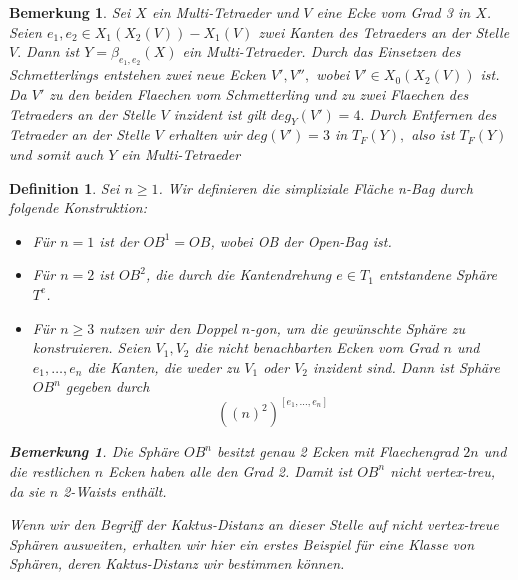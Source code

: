 \documentclass[12pt,titlepage,twoside,cleardoublepage]{article}
\theoremstyle{nummermitklammern}
\newtheorem{definition}[temp]{Definition}
\newtheorem{bemerkung}[temp]{Bemerkung}
\newtheorem{definition}[zahl]{Definition}
\newtheorem{bemerkung}[zahl]{Bemerkung}
\numberwithin{equation}{section}
\begin{document}
\begin{bemerkung}
Sei $X$ ein Multi-Tetraeder und $V$ eine Ecke vom Grad 3 in $X$. Seien $e_1,e_2\in X_1(X_2(V))-X_1(V)$ zwei Kanten des Tetraeders an der Stelle $V.$ Dann ist $Y=\beta_{e_1,e_2}(X)$ ein Multi-Tetraeder. Durch das Einsetzen des Schmetterlings entstehen zwei neue Ecken $V',V'',$ wobei $V'\in X_0(X_2(V))$ ist. Da $V'$ zu den beiden Flaechen vom Schmetterling und zu zwei Flaechen des Tetraeders an der Stelle $V$ inzident ist gilt $deg_Y(V')=4.$ Durch Entfernen des Tetraeder an der Stelle $V$ erhalten wir $deg(V')=3$ in $T_F(Y), $ also ist $T_F(Y) $ und somit auch $Y$ ein Multi-Tetraeder   
\end{bemerkung}

\begin{definition}
Sei $n\geq 1$. Wir definieren die simpliziale Fläche n-Bag durch folgende Konstruktion:
\begin{itemize}
\item Für $n=1$ ist der $OB^1=OB$, wobei OB der Open-Bag ist.
\item Für $n=2$ ist $OB^2$, die durch die Kantendrehung $e\in T_1$ entstandene Sphäre $T^e$.
\item Für $n\geq 3$ nutzen wir den Doppel $n$-gon, um die gewünschte Sphäre zu konstruieren. Seien $V_1,V_2$ die nicht benachbarten Ecken vom Grad $n$ und $e_1,\ldots, e_n$ die Kanten, die weder zu $V_1$ oder $V_2$ inzident sind. Dann ist Sphäre $OB^n$ gegeben durch
\[
{((n)^2)}^{[e_1,\ldots,e_n]}
\]
\end{itemize}
\begin{bemerkung}
Die Sphäre $OB^n$ besitzt genau 2 Ecken mit Flaechengrad $2n$ und die restlichen $n$ Ecken haben alle den Grad 2. Damit ist $OB^n$ nicht vertex-treu, da sie $n$ 2-Waists enthält.
\end{bemerkung}
Wenn wir den Begriff der Kaktus-Distanz an dieser Stelle auf nicht vertex-treue Sphären ausweiten, erhalten wir hier ein erstes Beispiel für eine Klasse von Sphären, deren Kaktus-Distanz wir bestimmen können. 
\begin{comment}
Sei $(OB^i,$ nun für $i\in \{2,\ldots,n-1\}$ konstruiert. Dann definiert man $OB^{i+1}$ wie folgt:
Man schaut sich zunächst die simpliziale Fläche $(X,<)$ mit
\begin{align*}
X_0:=OB^i_0 \cup Y_0\\
X_1:=OB^i_1\cup Y_1\\
X_2:=OB^i_2 \cup Y_2,
\end{align*}
wobei $Y$ eine simpliziale Fläche ist, die isomorph zum Open-Bag ist und $Y \cap OB^i=\emptyset $ erfüllt. Sei $(e_1,e_2)$ der 2-Waist in $Y\subset X$ 

\end{comment}
\end{definition}
\end{document}
